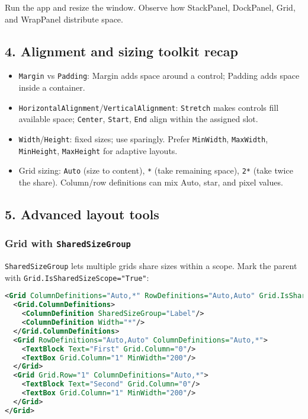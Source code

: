 Run the app and resize the window. Observe how StackPanel, DockPanel,
Grid, and WrapPanel distribute space.

\subsection{4. Alignment and sizing toolkit
recap}\label{alignment-and-sizing-toolkit-recap}

\begin{itemize}
\tightlist
\item
  \passthrough{\lstinline!Margin!} vs \passthrough{\lstinline!Padding!}:
  Margin adds space around a control; Padding adds space inside a
  container.
\item
  \passthrough{\lstinline!HorizontalAlignment!}/\passthrough{\lstinline!VerticalAlignment!}:
  \passthrough{\lstinline!Stretch!} makes controls fill available space;
  \passthrough{\lstinline!Center!}, \passthrough{\lstinline!Start!},
  \passthrough{\lstinline!End!} align within the assigned slot.
\item
  \passthrough{\lstinline!Width!}/\passthrough{\lstinline!Height!}:
  fixed sizes; use sparingly. Prefer \passthrough{\lstinline!MinWidth!},
  \passthrough{\lstinline!MaxWidth!},
  \passthrough{\lstinline!MinHeight!},
  \passthrough{\lstinline!MaxHeight!} for adaptive layouts.
\item
  Grid sizing: \passthrough{\lstinline!Auto!} (size to content),
  \passthrough{\lstinline!*!} (take remaining space),
  \passthrough{\lstinline!2*!} (take twice the share). Column/row
  definitions can mix Auto, star, and pixel values.
\end{itemize}

\subsection{5. Advanced layout tools}\label{advanced-layout-tools}

\subsubsection{\texorpdfstring{Grid with
\texttt{SharedSizeGroup}}{Grid with SharedSizeGroup}}\label{grid-with-sharedsizegroup}

\passthrough{\lstinline!SharedSizeGroup!} lets multiple grids share
sizes within a scope. Mark the parent with
\passthrough{\lstinline!Grid.IsSharedSizeScope="True"!}:

\begin{lstlisting}[language=XML]
<Grid ColumnDefinitions="Auto,*" RowDefinitions="Auto,Auto" Grid.IsSharedSizeScope="True">
  <Grid.ColumnDefinitions>
    <ColumnDefinition SharedSizeGroup="Label"/>
    <ColumnDefinition Width="*"/>
  </Grid.ColumnDefinitions>
  <Grid RowDefinitions="Auto,Auto" ColumnDefinitions="Auto,*">
    <TextBlock Text="First" Grid.Column="0"/>
    <TextBox Grid.Column="1" MinWidth="200"/>
  </Grid>
  <Grid Grid.Row="1" ColumnDefinitions="Auto,*">
    <TextBlock Text="Second" Grid.Column="0"/>
    <TextBox Grid.Column="1" MinWidth="200"/>
  </Grid>
</Grid>
\end{lstlisting}

